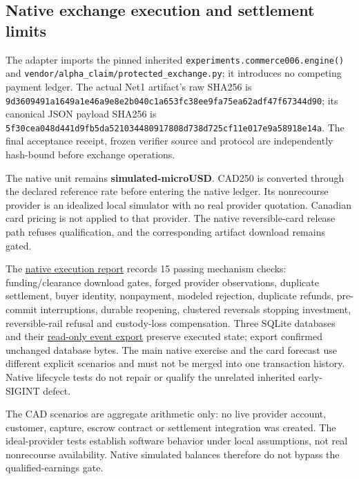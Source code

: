 \documentclass[
  11pt,
]{article}
\begin{document}
\hypertarget{native-exchange-execution-and-settlement-limits}{%
\subsection{Native exchange execution and settlement
limits}\label{native-exchange-execution-and-settlement-limits}}

The adapter imports the pinned inherited
\texttt{experiments.commerce006.engine()} and
\nolinkurl{vendor/alpha_claim/protected_exchange.py}; it introduces no
competing payment ledger. The actual Net1 artifact's raw SHA256 is
\nolinkurl{9d3609491a1649a1e46a9e8e2b040c1a653fc38ee9fa75ea62adf47f67344d90};
its canonical JSON payload SHA256 is
\nolinkurl{5f30cea048d441d9fb5da521034480917808d738d725cf11e017e9a58918e14a}.
The final acceptance receipt, frozen verifier source and protocol are
independently hash-bound before exchange operations.

The native unit remains \textbf{simulated-microUSD}. CAD250 is converted
through the declared reference rate before entering the native ledger.
Its nonrecourse provider is an idealized local simulator with no real
provider quotation. Canadian card pricing is not applied to that
provider. The native reversible-card release path refuses qualification,
and the corresponding artifact download remains gated.

The
\href{https://github.com/MontrealAI/AGI-Alpha-Invention-Flywheel-Lab/blob/b0d828309f14ef4dc278dc522739df85db43c460/evidence/next009/commerce/net1-primary-final-v1/artifacts/NATIVE_EXCHANGE.json}{native
execution report} records 15 passing mechanism checks: funding/clearance
download gates, forged provider observations, duplicate settlement,
buyer identity, nonpayment, modeled rejection, duplicate refunds,
pre-commit interruptions, durable reopening, clustered reversals
stopping investment, reversible-rail refusal and custody-loss
compensation. Three SQLite databases and their
\href{https://github.com/MontrealAI/AGI-Alpha-Invention-Flywheel-Lab/blob/b0d828309f14ef4dc278dc522739df85db43c460/evidence/next009/archives/commerce-r1.manifest.json}{read-only
event export} preserve executed state; export confirmed unchanged
database bytes. The main native exercise and the card forecast use
different explicit scenarios and must not be merged into one transaction
history. Native lifecycle tests do not repair or qualify the unrelated
inherited early-SIGINT defect.

The CAD scenarios are aggregate arithmetic only: no live provider
account, customer, capture, escrow contract or settlement integration
was created. The ideal-provider tests establish software behavior under
local assumptions, not real nonrecourse availability. Native simulated
balances therefore do not bypass the qualified-earnings gate.
\end{document}
